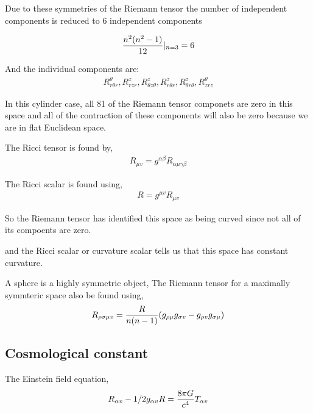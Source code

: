 \documentclass{Note}
\begin{document}
Due to these symmetries of the Riemann tensor the number of independent components is reduced to 6 independent components

\begin{equation}
\begin{aligned}
{n^2(n^2-1)\over 12}|_{n=3}=6 
\end{aligned}
\end{equation}

And the individual components are:
\begin{equation}
\begin{aligned}
R_{r\theta r}^\theta,R_{rzr}^{z},R_{\theta z \theta}^z, R_{r\theta r}^z, R_{\theta r \theta}^z, R_{zrz}^\theta
\end{aligned}
\end{equation}

In this cylinder case, all 81 of the Riemann tensor componets are zero in this space and all of the contraction of these components will also be zero because we are in flat Euclidean space.

The Ricci tensor is found by,
\begin{equation}
\begin{aligned}
R_{\mu v}=g^{\alpha\beta}R_{\alpha\mu\gamma\beta}
\end{aligned}
\end{equation}

The Ricci scalar is found using,
\begin{equation}
\begin{aligned}
R=g^{\mu v}R_{\mu v}
\end{aligned}
\end{equation}

So the Riemann tensor has identified this space as being curved since not all of its compoents are zero.

and the Ricci scalar or curvature scalar tells us that this space has constant curvature.

A sphere is a highly symmetric object, The Riemann tensor for a maximally symmteric space also be found using,
\begin{equation}
\begin{aligned}
R_{\rho \sigma \mu v}={R\over n(n-1)}(g_{\rho\mu}g_{\sigma v}-g_{\rho v}g_{\sigma\mu})
\end{aligned}
\end{equation}


\subsection{Cosmological constant}
The Einstein field equation,
\begin{equation}
\begin{aligned}
R_{\alpha v}-1/2g_{\alpha v}R={8\pi G\over c^4} T_{\alpha v}
\end{aligned}
\end{equation}
\end{document}
